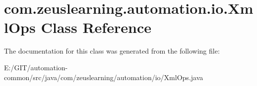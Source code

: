 \hypertarget{classcom_1_1zeuslearning_1_1automation_1_1io_1_1XmlOps}{}\section{com.\+zeuslearning.\+automation.\+io.\+Xml\+Ops Class Reference}
\label{classcom_1_1zeuslearning_1_1automation_1_1io_1_1XmlOps}


The documentation for this class was generated from the following file\+:\begin{DoxyCompactItemize}
\item 
E\+:/\+G\+I\+T/automation-\/common/src/java/com/zeuslearning/automation/io/Xml\+Ops.\+java\end{DoxyCompactItemize}
